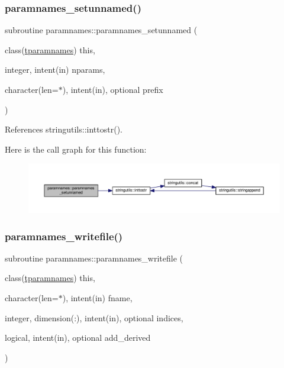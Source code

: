 \mbox{\label{namespaceparamnames_a14599044d57b0e3f49f29352409664d9}} 
\subsubsection{\texorpdfstring{paramnames\+\_\+setunnamed()}{paramnames\_setunnamed()}}
{\footnotesize\ttfamily subroutine paramnames\+::paramnames\+\_\+setunnamed (\begin{DoxyParamCaption}\item[{class(\mbox{\hyperlink{structparamnames_1_1tparamnames}{tparamnames}})}]{this,  }\item[{integer, intent(in)}]{nparams,  }\item[{character(len=$\ast$), intent(in), optional}]{prefix }\end{DoxyParamCaption})\hspace{0.3cm}{\ttfamily [private]}}



References stringutils\+::inttostr().

Here is the call graph for this function\+:
\nopagebreak
\begin{figure}[H]
\begin{center}
\leavevmode
\includegraphics[width=350pt]{namespaceparamnames_a14599044d57b0e3f49f29352409664d9_cgraph}
\end{center}
\end{figure}
\mbox{\label{namespaceparamnames_a48fa130be264dd406bc64dc0c5c7c448}} 
\subsubsection{\texorpdfstring{paramnames\+\_\+writefile()}{paramnames\_writefile()}}
{\footnotesize\ttfamily subroutine paramnames\+::paramnames\+\_\+writefile (\begin{DoxyParamCaption}\item[{class(\mbox{\hyperlink{structparamnames_1_1tparamnames}{tparamnames}})}]{this,  }\item[{character(len=$\ast$), intent(in)}]{fname,  }\item[{integer, dimension(\+:), intent(in), optional}]{indices,  }\item[{logical, intent(in), optional}]{add\+\_\+derived }\end{DoxyParamCaption})\hspace{0.3cm}{\ttfamily [private]}}




